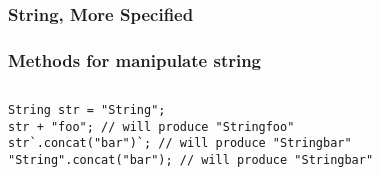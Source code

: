 \documentclass[en, 11pt, xcolor=dvipsnames]{beamer}
\begin{document}
\subsubsection{String, More Specified}
\begin{frame}[fragile]
	\frametitle{Methods for manipulate string}


	\begin{columns}[c]
		\begin{column}{0.9\textwidth}

			\begin{lstlisting}[style=Java]
String str = "String";
str + "foo"; // will produce "Stringfoo"
str`.concat("bar")`; // will produce "Stringbar"
"String".concat("bar"); // will produce "Stringbar"\end{lstlisting}



\end{column}
\end{columns}
\end{frame}
\end{document}
